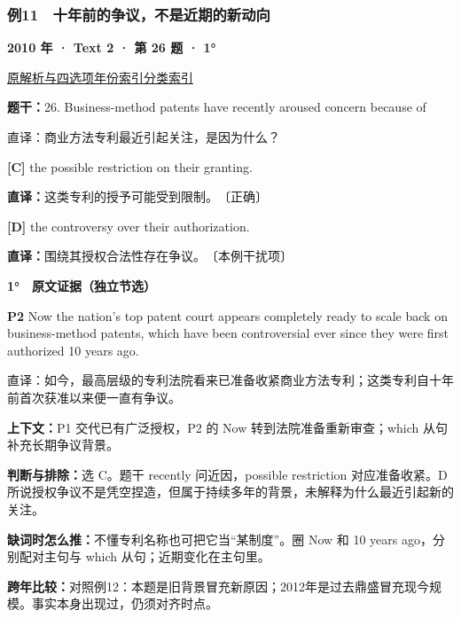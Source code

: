 \documentclass[11pt,a4paper]{article}
\begin{document}
\subsubsection{例11　十年前的争议，不是近期的新动向}\label{case-2010-T2-Q26}
\noindent\textbf{2010 年 · Text 2 · 第 26 题 · 1°}\par\noindent \href{https://zj139.github.io/math-notes/english/68417426c052b03f4b409683/\#q26}{原解析与四选项}\quad \hyperref[idx-2010-T2-Q26]{年份索引}\quad \hyperref[class-R06]{分类索引}\par\smallskip
\noindent\textbf{题干：}26. Business-method patents have recently aroused concern because of\par
直译：商业方法专利最近引起关注，是因为什么？\par
{}\noindent\textbf{[C]} the possible restriction on their granting.\par\nopagebreak
\noindent\textbf{直译：}这类专利的授予可能受到限制。　〔正确〕\par
{}\noindent\textbf{[D]} the controversy over their authorization.\par\nopagebreak
\noindent\textbf{直译：}围绕其授权合法性存在争议。　〔本例干扰项〕\par
\begin{evidence}\textbf{1°　原文证据（独立节选）}\par
\textbf{P2} Now the nation's top patent court appears completely ready to scale back on business-method patents, which have been controversial ever since they were first authorized 10 years ago.\par 直译：如今，最高层级的专利法院看来已准备收紧商业方法专利；这类专利自十年前首次获准以来便一直有争议。\par
\end{evidence}
\noindent\textbf{上下文：}P1 交代已有广泛授权，P2 的 Now 转到法院准备重新审查；which 从句补充长期争议背景。\par
\noindent\textbf{判断与排除：}选 C。题干 recently 问近因，possible restriction 对应准备收紧。D 所说授权争议不是凭空捏造，但属于持续多年的背景，未解释为什么最近引起新的关注。\par
\noindent\textbf{缺词时怎么推：}不懂专利名称也可把它当“某制度”。圈 Now 和 10 years ago，分别配对主句与 which 从句；近期变化在主句里。\par
\noindent\textbf{跨年比较：}对照例12：本题是旧背景冒充新原因；2012年是过去鼎盛冒充现今规模。事实本身出现过，仍须对齐时点。\par
\clearpage
\end{document}
